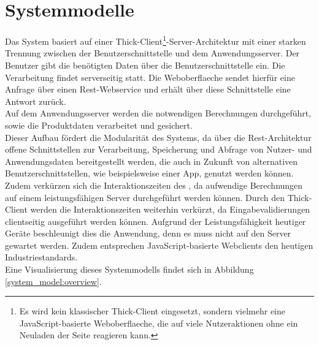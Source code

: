 \section{Systemmodelle}
Das System basiert auf einer Thick-Client\footnote{Es wird kein klassischer Thick-Client eingesetzt, sondern vielmehr eine JavaScript-basierte \gls{Weboberflaeche}, die auf viele Nutzeraktionen ohne ein Neuladen der Seite reagieren kann.}-Server-Architektur mit einer starken Trennung zwischen der Benutzerschnittstelle und dem Anwendungsserver. Der \gls{Benutzer} gibt die benötigten Daten über die Benutzerschnittstelle ein. Die Verarbeitung findet serverseitig statt. Die \gls{Weboberflaeche} sendet hierfür eine Anfrage über einen \gls{Rest}-\gls{Webservice} und erhält über diese Schnittstelle eine Antwort zurück. \\
Auf dem Anwendungsserver werden die notwendigen Berechnungen durchgeführt, sowie die Produktdaten verarbeitet und gesichert. \\
Dieser Aufbau fördert die Modularität des Systems, da über die \gls{Rest}-Architektur offene Schnittstellen zur Verarbeitung, Speicherung und Abfrage von Nutzer- und Anwendungsdaten bereitgestellt werden, die auch in Zukunft von alternativen Benutzerschnittstellen, wie beispielsweise einer App, genutzt werden können. Zudem verkürzen sich die Interaktionszeiten des , da aufwendige Berechnungen auf einem leistungsfähigen Server durchgeführt werden können. Durch den Thick-Client werden die Interaktionszeiten weiterhin verkürzt, da Eingabevalidierungen clientseitig ausgeführt werden können. Aufgrund der Leistungsfähigkeit heutiger Geräte beschleunigt dies die Anwendung, denn es muss nicht auf den Server gewartet werden. Zudem entsprechen JavaScript-basierte Webclients den heutigen Industriestandards. \\
Eine Visualisierung dieses Systemmodells findet sich in Abbildung \ref{system_model:overview}.